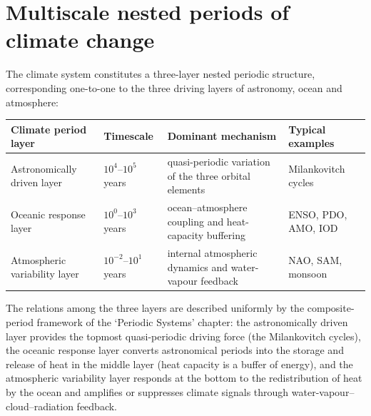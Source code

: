 \section{Multiscale nested periods of climate change}

\begin{theorem}\label{thm:climate_nested_periods}
The climate system constitutes a three-layer nested periodic structure, corresponding one-to-one to the three driving layers of astronomy, ocean and atmosphere:

\begin{center}
\begin{tabular}{>{\centering\arraybackslash}p{3cm}>{\centering\arraybackslash}p{2.2cm}>{\centering\arraybackslash}p{3.5cm}>{\centering\arraybackslash}p{3cm}}
\toprule
Climate period layer & Timescale & Dominant mechanism & Typical examples \\
\midrule
Astronomically driven layer & $10^4$--$10^5$ years & quasi-periodic variation of the three orbital elements & Milankovitch cycles \\
Oceanic response layer & $10^0$--$10^3$ years & ocean--atmosphere coupling and heat-capacity buffering & ENSO, PDO, AMO, IOD \\
Atmospheric variability layer & $10^{-2}$--$10^1$ years & internal atmospheric dynamics and water-vapour feedback & NAO, SAM, monsoon \\
\bottomrule
\end{tabular}
\end{center}

The relations among the three layers are described uniformly by the composite-period framework of the `Periodic Systems' chapter: the astronomically driven layer provides the topmost quasi-periodic driving force (the Milankovitch cycles), the oceanic response layer converts astronomical periods into the storage and release of heat in the middle layer (heat capacity is a buffer of energy), and the atmospheric variability layer responds at the bottom to the redistribution of heat by the ocean and amplifies or suppresses climate signals through water-vapour--cloud--radiation feedback.
\end{theorem}

